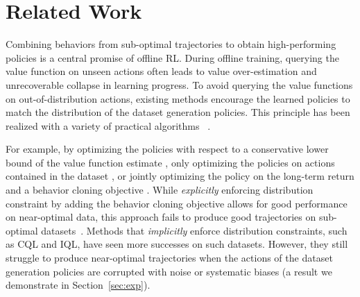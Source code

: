 \section{Related Work}

Combining behaviors from sub-optimal trajectories to obtain high-performing policies is a central promise of offline RL. During offline training, querying the value function on unseen actions often leads to value over-estimation and unrecoverable collapse in learning progress. To avoid querying the value functions on out-of-distribution actions, existing methods encourage the learned policies to match the distribution of the dataset generation policies. This principle has been realized with a variety of practical algorithms ~\cite{jaques2019way,brac,peng2019awr,siegel2020keep,brac,kumar2019stabilizing, kostrikov2021offline,kostrikov2021offlineb,wang2020critic,fujimoto2021minimalist, BAIL, furuta2022generalized, jang2022gptcritic, meng2022offline, daoudi2022density, liu2022robust}.

For example, by optimizing the policies with respect to a conservative lower bound of the value function estimate \cite{kumar2020conservative}, only optimizing the policies on actions contained in the dataset \cite{kostrikov2021offline}, or jointly optimizing the policy on the long-term return and a behavior cloning objective \cite{fujimoto2021minimalist}. While \textit{explicitly} enforcing distribution constraint by adding the behavior cloning objective allows for good performance on near-optimal data, 
this approach fails to produce good trajectories on sub-optimal datasets~\cite{kostrikov2021offline}.
Methods that \textit{implicitly} enforce distribution constraints, such as CQL and IQL, have seen more successes on such datasets.
However, they still struggle to produce near-optimal trajectories when the actions of the dataset generation policies are corrupted with noise or systematic biases (a result we demonstrate in Section~\ref{sec:exp}).

